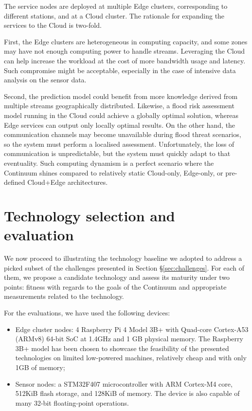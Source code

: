 The service nodes are deployed at multiple Edge clusters, corresponding to different stations, and at a Cloud cluster. The rationale for expanding the services to the Cloud is two-fold.

First, the Edge clusters are heterogeneous in computing capacity, and some zones may have not enough computing power to handle streams. Leveraging the Cloud can help increase the workload at the cost of more bandwidth usage and latency. Such compromise might be acceptable, especially in the case of intensive data analysis on the sensor data.

Second, the prediction model could benefit from more knowledge derived from multiple streams geographically distributed. Likewise, a flood risk assessment model running in the Cloud could achieve a globally optimal solution, whereas Edge services can output only locally optimal results. On the other hand, the communication channels may become unavailable during flood threat scenarios, so the system must perform a localised assessment. Unfortunately, the loss of communication is unpredictable, but the system must quickly adapt to that eventuality. Such computing dynamism is a perfect scenario where the Continuum shines compared to relatively static Cloud-only, Edge-only, or pre-defined Cloud+Edge architectures.

\section{Technology selection and evaluation}\label{sec:technology-selection}

We now proceed to illustrating the technology baseline we adopted to address a picked subset of the challenges presented in Section §\ref{sec:challenges}. For each of them, we propose a candidate technology and assess its maturity under two points: fitness with regards to the goals of the Continuum and appropriate measurements related to the technology.

For the evaluations, we have used the following devices:

\begin{itemize}
    \item Edge cluster nodes: 4 Raspberry Pi 4 Model 3B+ with Quad-core Cortex-A53 (ARMv8) 64-bit SoC at 1.4GHz and 1 GB physical memory. The Raspberry 3B+ model has been chosen to showcase the feasibility of the presented technologies on limited low-powered machines, relatively cheap and with only 1GB of memory;
    \item Sensor nodes: a STM32F407 microcontroller with ARM Cortex-M4 core, 512KiB flash storage, and 128KiB of memory. The device is also capable of many 32-bit floating-point operations.
\end{itemize}

